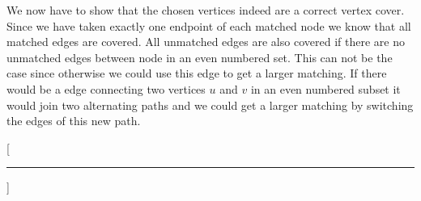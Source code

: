 \documentclass[a4paper, 12pt]{report}
\begin{document}
We now have to show that the chosen vertices indeed are a correct vertex cover.
Since we have taken exactly one endpoint of each matched node we know that all
matched edges are covered. All unmatched edges are also covered if there are no
unmatched edges between node in an even numbered set. This can not be the case
since otherwise we could use this edge to get a larger matching. If there would
be a edge connecting two vertices $u$ and $v$ in an even numbered subset it
would join two alternating paths and we could get a larger matching by
switching the edges of this new path.


\titleformat{\chapter}{\sffamily\bfseries}{}{0pt}{}[{\color{aqua}\hrule}]
\printbibliography
\end{document}
